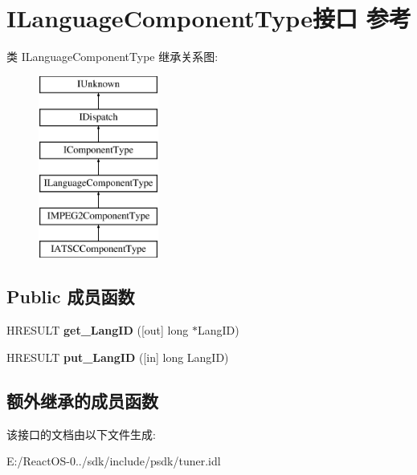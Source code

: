 \hypertarget{interface_i_language_component_type}{}\section{I\+Language\+Component\+Type接口 参考}
\label{interface_i_language_component_type}
类 I\+Language\+Component\+Type 继承关系图\+:\begin{figure}[H]
\begin{center}
\leavevmode
\includegraphics[height=6.000000cm]{interface_i_language_component_type}
\end{center}
\end{figure}
\subsection*{Public 成员函数}
\begin{DoxyCompactItemize}
\item 
\mbox{\label{interface_i_language_component_type_a56c3386a3901a23a6f22fddc05c19399}} 
H\+R\+E\+S\+U\+LT {\bfseries get\+\_\+\+Lang\+ID} (\mbox{[}out\mbox{]} long $\ast$Lang\+ID)
\item 
\mbox{\label{interface_i_language_component_type_a64eeeea5f28531846144dd0b66423e21}} 
H\+R\+E\+S\+U\+LT {\bfseries put\+\_\+\+Lang\+ID} (\mbox{[}in\mbox{]} long Lang\+ID)
\end{DoxyCompactItemize}
\subsection*{额外继承的成员函数}


该接口的文档由以下文件生成\+:\begin{DoxyCompactItemize}
\item 
E\+:/\+React\+O\+S-\/0../sdk/include/psdk/tuner.\+idl\end{DoxyCompactItemize}
